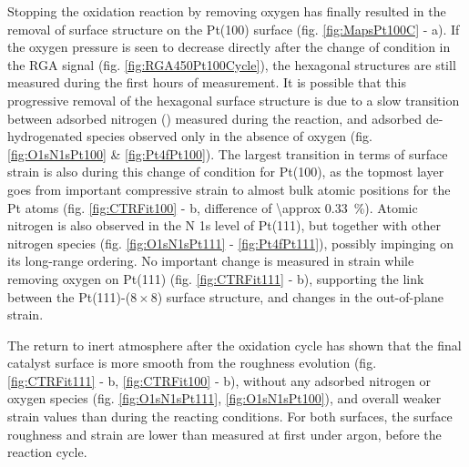 Stopping the oxidation reaction by removing oxygen has finally resulted in the removal of surface structure on the Pt(100) surface (fig. \ref{fig:MapsPt100C} - a).
If the oxygen pressure is seen to decrease directly after the change of condition in the RGA signal (fig. \ref{fig:RGA450Pt100Cycle}), the hexagonal structures are still measured during the first hours of measurement.
It is possible that this progressive removal of the hexagonal surface structure is due to a slow transition between adsorbed nitrogen () measured during the reaction, and adsorbed de-hydrogenated species observed only in the absence of oxygen (fig. \ref{fig:O1sN1sPt100} \& \ref{fig:Pt4fPt100}).
The largest transition in terms of surface strain is also during this change of condition for Pt(100), as the topmost layer goes from important compressive strain to almost bulk atomic positions for the Pt atoms (fig. \ref{fig:CTRFit100} - b, difference of \qty{\approx 0.33}{\percent}).
Atomic nitrogen is also observed in the N 1s level of Pt(111), but together with other nitrogen species (fig. \ref{fig:O1sN1sPt111} - \ref{fig:Pt4fPt111}), possibly impinging on its long-range ordering.
No important change is measured in strain while removing oxygen on Pt(111) (fig. \ref{fig:CTRFit111} - b), supporting the link between the Pt(111)-($8\times8$) surface structure, and changes in the out-of-plane strain.


The return to inert atmosphere after the oxidation cycle has shown that the final catalyst surface is more smooth from the roughness evolution (fig. \ref{fig:CTRFit111} - b, \ref{fig:CTRFit100} - b), without any adsorbed nitrogen or oxygen species (fig. \ref{fig:O1sN1sPt111}, \ref{fig:O1sN1sPt100}), and overall weaker strain values than during the reacting conditions.
For both surfaces, the surface roughness and strain are lower than measured at first under argon, before the reaction cycle.


